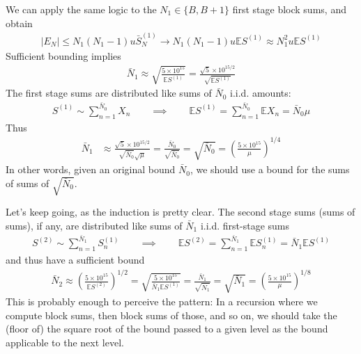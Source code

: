 \documentclass[11pt, oneside]{amsart}   	%
\begin{document}
We can apply the same logic to the $N_1 \in \{B,B+1\}$ first stage block sums, and obtain
\begin{align*}
    | E_N | \leq N_1(N_1-1) u \bar{S}_N^{(1)} \to N_1(N_1-1) u \mathbb{E}S^{(1)} \approx N_1^2 u \mathbb{E}S^{(1)}
\end{align*}
Sufficient bounding implies
\begin{align*}
    \bar{N}_1 \approx \sqrt{ \frac{5 \times 10^{15}}{\mathbb{E}S^{(1)}} }
    	= \frac{\sqrt{5} \times 10^{15/2}}{\sqrt{\mathbb{E}S^{(1)}}}
\end{align*}
The first stage sums are distributed like sums of $\bar{N}_0$ i.i.d. amounts: 
\begin{align*}
	S^{(1)} \sim \sum_{n=1}^{\bar{N}_0} X_n
	\quad\quad\implies\quad\quad
	\mathbb{E}S^{(1)} = \sum_{n=1}^{\bar{N}_0} \mathbb{E}X_n = \bar{N}_0 \mu
\end{align*}
Thus 
\begin{align*}
    \bar{N}_1 &\approx \frac{\sqrt{5} \times 10^{15/2}}{ \sqrt{\bar{N}_0}\sqrt{\mu} }
    		= \frac{\bar{N}_0}{\sqrt{\bar{N}_0}} = \sqrt{\bar{N}_0}
	= \left( \frac{ 5 \times 10^{15} }{ \mu } \right)^{1/4} 
\end{align*}
In other words, given an original bound $\bar{N}_0$, we should use a bound for the sums of sums of $\sqrt{\bar{N}_0}$. 

Let's keep going, as the induction is pretty clear. The second stage sums (sums of sums), if any, are distributed like sums of $\bar{N}_1$ i.i.d. first-stage sums
\begin{align*}
	S^{(2)} \sim \sum_{n=1}^{\bar{N}_1} S_n^{(1)}
	\quad\quad\implies\quad\quad
	\mathbb{E}S^{(2)} = \sum_{n=1}^{\bar{N}_1} \mathbb{E}S_n^{(1)} = \bar{N}_1\mathbb{E}S^{(1)}
\end{align*}
and thus have a sufficient bound
\begin{align*}
    \bar{N}_2 \approx \left(  \frac{5 \times 10^{15}}{\mathbb{E}S^{(2)} } \right)^{1/2}
    	= \sqrt{ \frac{5 \times 10^{15}}{\bar{N}_1\mathbb{E}S^{(1)} } }
	= \frac{\bar{N}_1}{ \sqrt{\bar{N}_1} } 
	= \sqrt{ \bar{N}_1 }
	= \left( \frac{ 5 \times 10^{15} }{ \mu } \right)^{1/8} 
\end{align*}
This is probably enough to perceive the pattern: In a recursion where we compute block sums, then block sums of those, and so on, we should take the (floor of) the square root of the bound passed to a given level as the bound applicable to the next level. 
\end{document}
